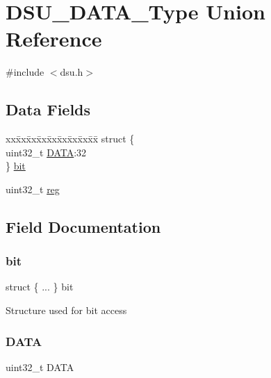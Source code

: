 \hypertarget{union_d_s_u___d_a_t_a___type}{}\section{D\+S\+U\+\_\+\+D\+A\+T\+A\+\_\+\+Type Union Reference}
\label{union_d_s_u___d_a_t_a___type}


{\ttfamily \#include $<$dsu.\+h$>$}

\subsection*{Data Fields}
\begin{DoxyCompactItemize}
\item 
\begin{tabbing}
xx\=xx\=xx\=xx\=xx\=xx\=xx\=xx\=xx\=\kill
struct \{\\
\>uint32\_t \mbox{\hyperlink{union_d_s_u___d_a_t_a___type_aad20077939fb7b9e145416f55028ea37}{DATA}}:32\\
\} \mbox{\hyperlink{union_d_s_u___d_a_t_a___type_a5a6c44b36ab9b3059da04c36a749773d}{bit}}\\

\end{tabbing}\item 
uint32\+\_\+t \mbox{\hyperlink{union_d_s_u___d_a_t_a___type_a6b91636401516a477989a336376d7b40}{reg}}
\end{DoxyCompactItemize}


\subsection{Field Documentation}
\mbox{\label{union_d_s_u___d_a_t_a___type_a5a6c44b36ab9b3059da04c36a749773d}} 
\subsubsection{\texorpdfstring{bit}{bit}}
{\footnotesize\ttfamily struct \{ ... \}   bit}

Structure used for bit access \mbox{\label{union_d_s_u___d_a_t_a___type_aad20077939fb7b9e145416f55028ea37}} 
\subsubsection{\texorpdfstring{DATA}{DATA}}
{\footnotesize\ttfamily uint32\+\_\+t D\+A\+TA}

